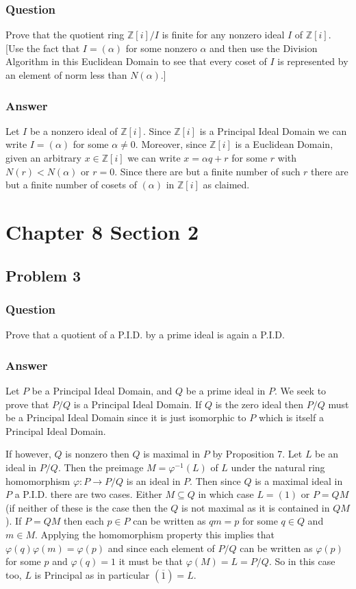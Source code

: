\documentclass[12pt]{article}
\begin{document}
\subsubsection{Question}
Prove that the quotient ring $\mathbb{Z}[i]/I$ is finite for any nonzero ideal $I$ of $\mathbb{Z}[i]$. [Use the fact that $I=(\alpha)$ for some nonzero $\alpha$ and then use the Division Algorithm in this Euclidean Domain to see that every coset of $I$ is represented by an element of norm less than $N(\alpha)$.]
\subsubsection{Answer}
Let $I$ be a nonzero ideal of $\mathbb{Z}[i]$. Since $\mathbb{Z}[i]$ is a Principal Ideal Domain we can write $I = (\alpha)$ for some $\alpha \neq 0$. Moreover, since $\mathbb{Z}[i]$ is a Euclidean Domain, given an arbitrary $x \in \mathbb{Z}[i]$ we can write $x = \alpha q + r$ for some $r$ with $N(r)< N(\alpha)$ or $r=0$. Since there are but a finite number of such $r$ there are but a finite number of cosets of $(\alpha)$ in $\mathbb{Z}[i]$ as claimed.


\section{Chapter 8 Section 2}
\subsection{Problem 3}

\subsubsection{Question}
Prove that a quotient of a P.I.D. by a prime ideal is again a P.I.D.
\subsubsection{Answer}
Let $P$ be a Principal Ideal Domain, and $Q$ be a prime ideal in $P$. We seek to prove that $P/Q$ is a Principal Ideal Domain. If $Q$ is the zero ideal then $P/Q$ must be a Principal Ideal Domain since it is just isomorphic to $P$ which is itself a Principal Ideal Domain.

If however, $Q$ is nonzero then $Q$ is maximal in $P$ by Proposition 7. Let $L$ be an ideal in $P/Q$. Then the preimage $M=\varphi^{-1}(L)$ of $L$ under the natural ring homomorphism $\varphi:P \to P/Q$ is an ideal in $P$. Then since $Q$ is a maximal ideal in $P$ a P.I.D. there are two cases. Either $M \subseteq  Q$  in which case $L = (1)$ or $P = Q M$ (if neither of these is the case then the $Q$ is not maximal as it is contained in $Q M $). If $P = Q M$ then each $p \in P$ can be written as $q m = p$ for some $q \in Q$ and $m \in M$. Applying the homomorphism property this implies that $\varphi(q) \varphi(m) = \varphi(p)$ and  since each element of $P/Q$ can be written as $\varphi(p)$ for some $p$ and $\varphi(q)=1$ it must be that $\varphi(M)=L=P/Q$. So in this case too, $L$ is Principal as in particular $(\overline{1})=L$.
\end{document}
